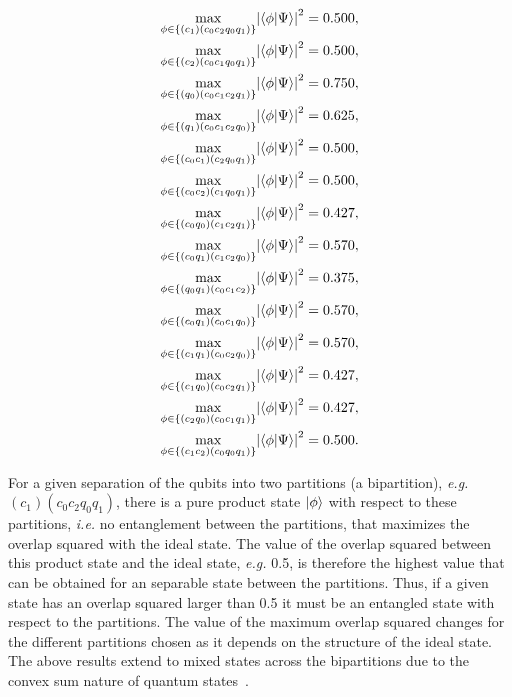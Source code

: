 \begin{align}
    \underset{\phi \in \{(c_1)(c_0c_2q_0q_1)\}}{\max}\abs{\braket{ \phi}{\Psi }}^{2} &= 0.500, \nonumber \\
    \underset{\phi \in \{(c_2)(c_0c_1q_0q_1)\}}{\max}\abs{\braket{ \phi}{\Psi }}^{2} &= 0.500, \nonumber \\
    \underset{\phi \in \{(q_0)(c_0c_1c_2q_1)\}}{\max}\abs{\braket{ \phi}{\Psi }}^{2} &= 0.750, \nonumber \\
    \underset{\phi \in \{(q_1)(c_0c_1c_2q_0)\}}{\max}\abs{\braket{ \phi}{\Psi }}^{2} &= 0.625, \nonumber \\
    \underset{\phi \in \{(c_0c_1)(c_2q_0q_1)\}}{\max}\abs{\braket{ \phi}{\Psi }}^{2} &= 0.500, \nonumber \\
    \underset{\phi \in \{(c_0c_2)(c_1q_0q_1)\}}{\max}\abs{\braket{\phi}{\Psi }}^{2} &= 0.500, \nonumber \\
    \underset{\phi \in \{(c_0q_0)(c_1c_2q_1)\}}{\max}\abs{\braket{ \phi}{\Psi }}^{2} &= 0.427, \nonumber \\
    \underset{\phi \in \{(c_0q_1)(c_1c_2q_0)\}}{\max}\abs{\braket{ \phi}{\Psi }}^{2} &= 0.570, \nonumber \\
    \underset{\phi \in \{(q_0q_1)(c_0c_1c_2)\}}{\max}\abs{\braket{ \phi}{\Psi }}^{2} &= 0.375, \nonumber \\
    \underset{\phi \in \{(c_0q_1)(c_0c_1q_0)\}}{\max}\abs{\braket{ \phi}{\Psi }}^{2} &= 0.570, \nonumber \\
    \underset{\phi \in \{(c_1q_1)(c_0c_2q_0)\}}{\max}\abs{\braket{ \phi}{\Psi }}^{2} &= 0.570, \nonumber \\
    \underset{\phi \in \{(c_1q_0)(c_0c_2q_1)\}}{\max}\abs{\braket{ \phi}{\Psi }}^{2} &= 0.427, \nonumber \\
    \underset{\phi \in \{(c_2q_0)(c_0c_1q_1)\}}{\max}\abs{\braket{ \phi}{\Psi }}^{2} &= 0.427, \nonumber \\
    \underset{\phi \in \{(c_1c_2)(c_0q_0q_1)\}}{\max}\abs{\braket{ \phi}{\Psi }}^{2} &= 0.500.
\end{align}

\noindent
For a given separation of the qubits into two partitions (a bipartition), {\it e.g.} $(c_1)(c_0c_2q_0q_1)$, there is a pure product state $\ket{\phi}$ with respect to these partitions, {\it i.e.} no entanglement between the partitions, that maximizes the overlap squared with the ideal state. The value of the overlap squared between this product state and the ideal state, {\it e.g.} 0.5, is therefore the highest value that can be obtained for an separable state between the partitions. Thus, if a given state has an overlap squared larger than 0.5 it must be an entangled state with respect to the partitions. The value of the maximum overlap squared changes for the different partitions chosen as it depends on the structure of the ideal state. The above results extend to mixed states across the bipartitions due to the convex sum nature of quantum states~\cite{Toth_2008}.

